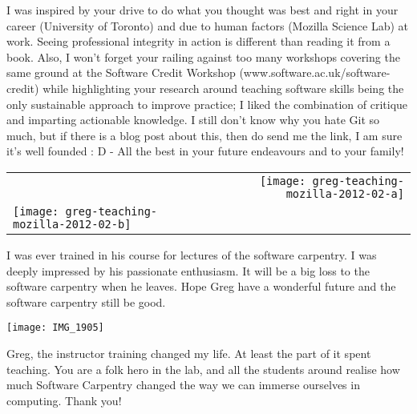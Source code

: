 I was inspired by your drive to do what you thought was best and right in your
career (University of Toronto) and due to human factors (Mozilla Science Lab)
at work. Seeing professional integrity in action is different than reading it
from a book. Also, I won't forget your railing against too many workshops
covering the same ground at the Software Credit Workshop
(www.software.ac.uk/software-credit) while highlighting your research around
teaching software skills being the only sustainable approach to improve
practice; I liked the combination of critique and imparting actionable
knowledge. I still don't know why you hate Git so much, but if there is a blog
post about this, then do send me the link, I am sure it's well founded  :  D  -
All the best in your future endeavours and to your family! 

\vspace*{\fill}

\newpage
\vspace*{\fill}

\begin{tabular*}{\textwidth}[t]{ l r }
    & \texttt{[image: greg-teaching-mozilla-2012-02-a]} \\
    \texttt{[image: greg-teaching-mozilla-2012-02-b]} & \\
\end{tabular*}

I was ever trained in his course for lectures of the software carpentry. I was
deeply impressed by his passionate enthusiasm. It will be a big loss to the
software carpentry when he leaves. Hope Greg have a wonderful future and the
software carpentry still be good.

\vspace*{\fill}

\newpage
\vspace*{\fill}

\begin{center}
\texttt{[image: IMG\_1905]}
\end{center}

Greg, the instructor training changed my life. At least the part of it spent
teaching. You are a folk hero in the lab, and all the students around realise
how much Software Carpentry changed the way we can immerse ourselves in
computing. Thank you!

\vspace*{\fill}

